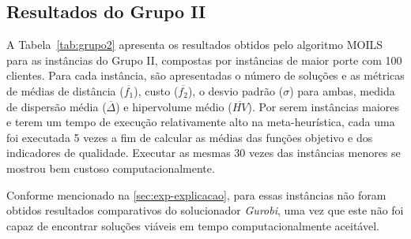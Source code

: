 \subsection{Resultados do Grupo II}\label{sec:g2}

A Tabela~\ref{tab:grupo2} apresenta os resultados obtidos pelo algoritmo MOILS para as instâncias do Grupo II, compostas por instâncias de maior porte com 100 clientes. Para cada instância, são apresentadas o número de soluções e as métricas de médias de distância ($\overline{f_1}$), custo ($\overline{f_2}$), o desvio padrão ($\sigma$) para ambas, medida de dispersão média ($\overline{\Delta}$) e hipervolume médio ($\overline{HV}$). Por serem instâncias maiores e terem um tempo de execução relativamente alto na meta-heurística, cada uma foi executada 5 vezes a fim de calcular as médias das funções objetivo e dos indicadores de qualidade. Executar as mesmas 30 vezes das instâncias menores se mostrou bem custoso computacionalmente. 

Conforme mencionado na \autoref{sec:exp-explicacao}, para essas instâncias não foram obtidos resultados comparativos do solucionador \textit{Gurobi}, uma vez que este não foi capaz de encontrar soluções viáveis em tempo computacionalmente aceitável.


